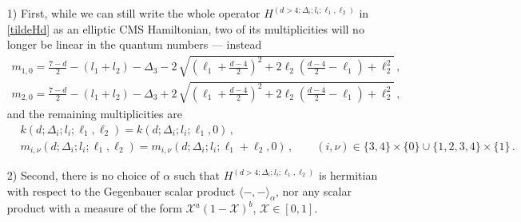 \documentclass{article}
\def \Dg {\Delta}
\def \ag {\alpha}
\begin{document}
\begin{itemize}
    \item[1)] First, while we can still write the whole operator $H^{(d>4;\Dg_i;l_i;\ell_1,\ell_2)}$ in \eqref{tildeHd} as an elliptic CMS Hamiltonian, two of its multiplicities will no longer be linear in the quantum numbers --- instead
   \begin{align*}
m_{1,0} = \frac{7-d}{2}-(l_1+l_2)-\Dg_3-2\, \sqrt{\left(\ell_1+\frac{d-4}{2}\right)^2 + 2\ell_2\left(\frac{d-4}{2}-\ell_1\right)+\ell_2^2}\,, \\
m_{2,0} =  \frac{7-d}{2}-(l_1+l_2)-\Dg_3+2\, \sqrt{\left(\ell_1+\frac{d-4}{2}\right)^2 + 2\ell_2\left(\frac{d-4}{2}-\ell_1\right)+\ell_2^2}\,, 
\end{align*}
and the remaining multiplicities are 
\begin{align*}
& k(d;\Dg_i;l_i;\ell_1,\ell_2) = k(d;\Dg_i;l_i;\ell_1,0)\,, \\
& m_{i,\nu}(d;\Dg_i;l_i;\ell_1,\ell_2) = m_{i,\nu}(d;\Dg_i;l_i;\ell_1+\ell_2,0)\,,\qquad (i,\nu) \in \{3,4\} \times \{0\} \cup \{1,2,3,4\}\times \{1\}\,.
\end{align*}

\item[2)] Second, there is no choice of $\ag$ such that $H^{(d>4;\Dg_i;l_i;\ell_1,\ell_2)}$ is hermitian with respect to the Gegenbauer scalar product $\langle -,- \rangle_{\ag}$, nor any scalar product with a measure of the form $\mathcal{X}^{a}(1-\mathcal{X})^b$, $\mathcal{X} \in [0,1]$. 


\end{itemize}
\end{document}
